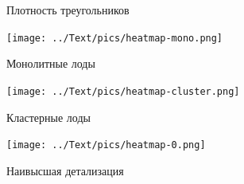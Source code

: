 


\begin{frame}{Плотность треугольников}
    \begin{center}
        \begin{minipage}{.45\textwidth}
            \begin{center}
                \texttt{[image: ../Text/pics/heatmap-mono.png]}

                Монолитные лоды
            \end{center}
        \end{minipage}
        \begin{minipage}{.45\textwidth}
            \begin{center}
                \texttt{[image: ../Text/pics/heatmap-cluster.png]}

                Кластерные лоды
            \end{center}
        \end{minipage}
        \begin{minipage}{.45\textwidth}
            \begin{center}
                \texttt{[image: ../Text/pics/heatmap-0.png]}

                Наивысшая детализация
            \end{center}
        \end{minipage}
    \end{center}
\end{frame}
